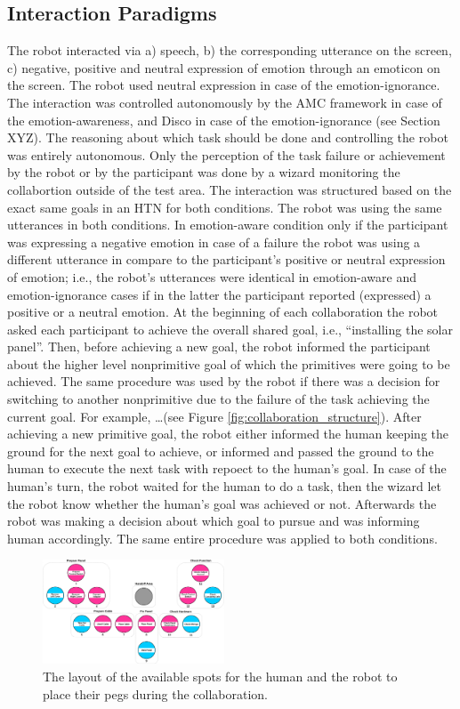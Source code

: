 \documentclass{sig-alternate-05-2015}
\begin{document}
\subsection{Interaction Paradigms}
\label{sec-interaction-paradigms}
The robot interacted via a) speech, b) the corresponding utterance on the
screen, c) negative, positive and neutral expression of emotion through an
emoticon on the screen. The robot used neutral expression in case of the
emotion-ignorance. The interaction was controlled autonomously by the AMC
framework in case of the emotion-awareness, and Disco in case of the
emotion-ignorance (see Section XYZ). The reasoning about which task should be
done and controlling the robot was entirely autonomous. Only the perception of
the task failure or achievement by the robot or by the participant was done by a
wizard monitoring the collabortion outside of the test area. The interaction was
structured based on the exact same goals in an HTN for both conditions. The
robot was using the same utterances in both conditions. In emotion-aware
condition only if the participant was expressing a negative emotion in case of a
failure the robot was using a different utterance in compare to the
participant's positive or neutral expression of emotion; i.e., the robot's
utterances were identical in emotion-aware and emotion-ignorance cases if in the
latter the participant reported (expressed) a positive or a neutral emotion. At
the beginning of each collaboration the robot asked each participant to achieve
the overall shared goal, i.e., ``installing the solar panel''. Then, before
achieving a new goal, the robot informed the participant about the higher level
nonprimitive goal of which the primitives were going to be achieved. The same
procedure was used by the robot if there was a decision for switching to another
nonprimitive due to the failure of the task achieving the current goal. For
example, \ldots (see Figure \ref{fig:collaboration_structure}). After achieving
a new primitive goal, the robot either informed the human keeping the ground for
the next goal to achieve, or informed and passed the ground to the human to
execute the next task with repoect to the human's goal. In case of the human's
turn, the robot waited for the human to do a task, then the wizard let the robot
know whether the human's goal was achieved or not. Afterwards the robot was
making a decision about which goal to pursue and was informing human
accordingly. The same entire procedure was applied to both conditions.

\begin{figure}[tbh]
  \centering
  \includegraphics[width=0.48\textwidth]{figure/gameBoard.pdf}
  \caption{The layout of the available spots for the human and the robot to
  place their pegs during the collaboration.}
  \label{fig:game_board}
\end{figure}
\end{document}
